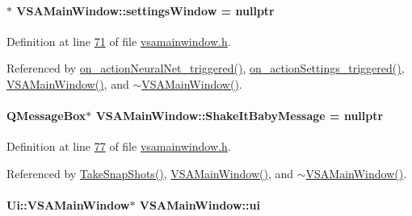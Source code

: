 \paragraph[{settings\+Window}]{$\ast$ V\+S\+A\+Main\+Window\+::settings\+Window = nullptr\hspace{0.3cm}{\ttfamily [private]}}\label{class_v_s_a_main_window_ae79d86cfa0c3adab847438b5b3dc34d6}


Definition at line \hyperlink{vsamainwindow_8h_source_l00071}{71} of file \hyperlink{vsamainwindow_8h_source}{vsamainwindow.\+h}.



Referenced by \hyperlink{vsamainwindow_8cpp_source_l00353}{on\+\_\+action\+Neural\+Net\+\_\+triggered()}, \hyperlink{vsamainwindow_8cpp_source_l00270}{on\+\_\+action\+Settings\+\_\+triggered()}, \hyperlink{vsamainwindow_8cpp_source_l00004}{V\+S\+A\+Main\+Window()}, and \hyperlink{vsamainwindow_8cpp_source_l00254}{$\sim$\+V\+S\+A\+Main\+Window()}.

\hypertarget{class_v_s_a_main_window_a819fbdf1137bb5f88c6638b0a9213f8c}{}
\paragraph[{Shake\+It\+Baby\+Message}]{\setlength{\rightskip}{0pt plus 5cm}Q\+Message\+Box$\ast$ V\+S\+A\+Main\+Window\+::\+Shake\+It\+Baby\+Message = nullptr\hspace{0.3cm}{\ttfamily [private]}}\label{class_v_s_a_main_window_a819fbdf1137bb5f88c6638b0a9213f8c}


Definition at line \hyperlink{vsamainwindow_8h_source_l00077}{77} of file \hyperlink{vsamainwindow_8h_source}{vsamainwindow.\+h}.



Referenced by \hyperlink{vsamainwindow_8cpp_source_l00391}{Take\+Snap\+Shots()}, \hyperlink{vsamainwindow_8cpp_source_l00004}{V\+S\+A\+Main\+Window()}, and \hyperlink{vsamainwindow_8cpp_source_l00254}{$\sim$\+V\+S\+A\+Main\+Window()}.

\hypertarget{class_v_s_a_main_window_a958a0581d2bf1bfe020c3b5d8f738640}{}
\paragraph[{ui}]{\setlength{\rightskip}{0pt plus 5cm}Ui\+::\+V\+S\+A\+Main\+Window$\ast$ V\+S\+A\+Main\+Window\+::ui\hspace{0.3cm}{\ttfamily [private]}}\label{class_v_s_a_main_window_a958a0581d2bf1bfe020c3b5d8f738640}


